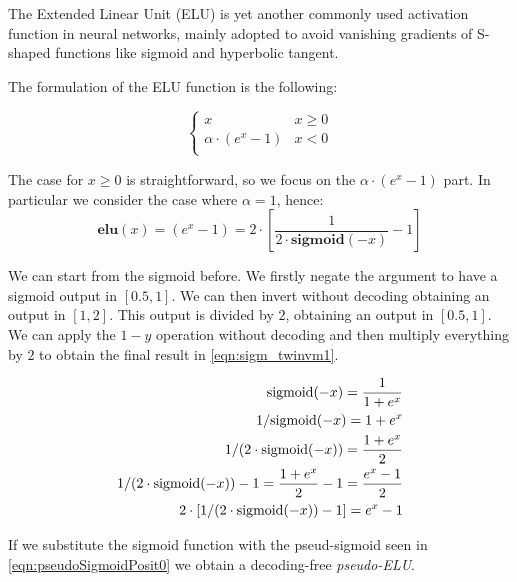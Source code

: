 The Extended Linear Unit (ELU) is yet another commonly used activation function in neural networks, mainly adopted to avoid vanishing gradients of S-shaped functions like sigmoid and hyperbolic tangent.

The formulation of the ELU function is the following:

\begin{equation}
\left\{\begin{matrix}
x & x \geq 0 \\
\alpha \cdot (e^x - 1) & x < 0  \\
\end{matrix}\right.
\end{equation}

The case for $x \geq 0$ is straightforward, so we focus on the $\alpha \cdot (e^x - 1)$ part. In particular we consider the case where $\alpha = 1$, hence:
\begin{equation}
    \mathbf{elu}(x) = (e^x - 1) = 2 \cdot \left [ \frac{1}{2\cdot \mathbf{sigmoid}(-x)} - 1 \right]
\end{equation}

We can start from the sigmoid before. We firstly negate the argument to have a sigmoid output in $[0.5,1]$. We can then invert without decoding obtaining an output in $[1,2]$. This output is divided by $2$, obtaining an output in $[0.5,1]$. We can apply the $1-y$ operation without decoding and then multiply everything by $2$ to obtain the final result in \eqref{eqn:sigm_twinvm1}.

\begin{align}
   \label{eqn:sigm_mx}\textnormal{sigmoid}(-x) = \frac{1}{1+e^{x}}  & \\
   \label{eqn:sigm_invx}1/\textnormal{sigmoid}(-x) = 1+e^x & \\
   \label{eqn:sigm_invtw}1/(2\cdot\textnormal{sigmoid}(-x)) = \frac{1+e^x}{2}& \\
   \label{eqn:sigm_invm1}1/(2\cdot\textnormal{sigmoid}(-x))-1 = \frac{1+e^x}{2} - 1 = \frac{e^x-1}{2} & \\
  \label{eqn:sigm_twinvm1}2\cdot[1/(2\cdot\textnormal{sigmoid}(-x))-1] = e^x -1&
\end{align}

If we substitute the sigmoid function with the pseud-sigmoid seen in \eqref{eqn:pseudoSigmoidPosit0} we obtain a decoding-free \textit{pseudo-ELU}.